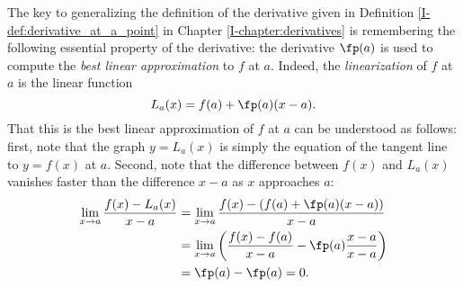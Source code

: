 The key to generalizing the definition of the derivative given in Definition \ref{I-def:derivative_at_a_point} in Chapter \ref{I-chapter:derivatives} is remembering the following essential property of the derivative: the derivative $\fp(a)$ is used to compute the \emph{best linear approximation} to $f$ at $a$. Indeed, the \emph{linearization} of $f$ at $a$ is the linear function
\begin{equation}\label{eq_linearization}
L_a(x) = f(a) +\fp(a)(x-a).
\end{equation}
That this is the best linear approximation of $f$ at $a$ can be understood as follows: first, note that the graph $y=L_a(x)$ is simply the equation of the tangent line to $y=f(x)$ at $a$. Second, note that the difference between $f(x)$ and $L_a(x)$ vanishes faster than the difference $x-a$ as $x$ approaches $a$:
\begin{align*}
\lim_{x\to a}\frac{f(x)-L_a(x)}{x-a} &= \lim_{x\to a}\frac{f(x)-(f(a)+\fp(a)(x-a))}{x-a}\\
& = \lim_{x\to a}\left(\frac{f(x)-f(a)}{x-a}-\fp(a)\frac{x-a}{x-a}\right)\\
& = \fp(a)-\fp(a)=0.
\end{align*}

